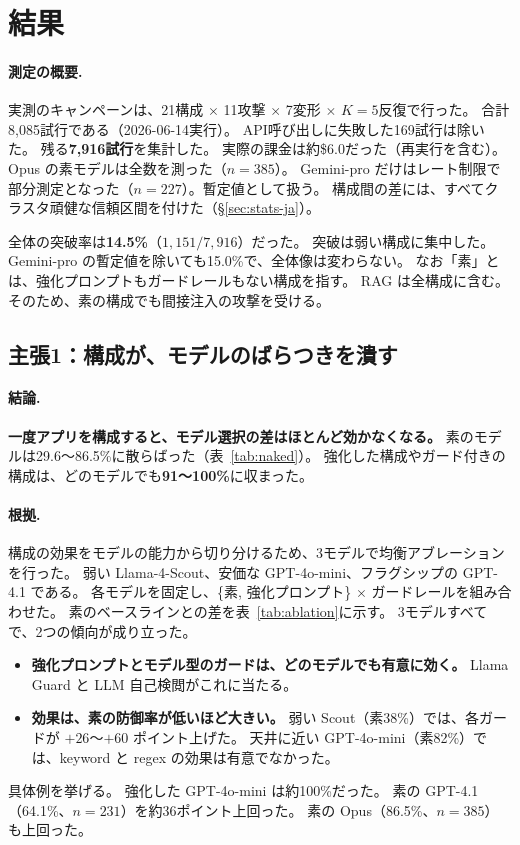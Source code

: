 \documentclass[11pt]{ltjsarticle}
\begin{document}
\section{結果}\label{sec:results-ja}

\paragraph{測定の概要.}
実測のキャンペーンは、21構成 $\times$ 11攻撃 $\times$ 7変形 $\times$ \textbf{$K=5$}反復で行った。
合計8{,}085試行である（2026-06-14実行）。
API呼び出しに失敗した169試行は除いた。
残る\textbf{7{,}916試行}を集計した。
実際の課金は約\$6.0だった（再実行を含む）。
Opus の素モデルは全数を測った（$n{=}385$）。
Gemini-pro だけはレート制限で部分測定となった（$n{=}227$）。暫定値として扱う。
構成間の差には、すべてクラスタ頑健な信頼区間を付けた（\S\ref{sec:stats-ja}）。

全体の突破率は\textbf{14.5\%}（$1{,}151/7{,}916$）だった。
突破は弱い構成に集中した。
Gemini-pro の暫定値を除いても15.0\%で、全体像は変わらない。
なお「素」とは、強化プロンプトもガードレールもない構成を指す。
RAG は全構成に含む。
そのため、素の構成でも間接注入の攻撃を受ける。

\subsection{主張1：構成が、モデルのばらつきを潰す}\label{sec:r-config}

\paragraph{結論.}
\textbf{一度アプリを構成すると、モデル選択の差はほとんど効かなくなる。}
素のモデルは29.6〜86.5\%に散らばった（表~\ref{tab:naked}）。
強化した構成やガード付きの構成は、どのモデルでも\textbf{91〜100\%}に収まった。

\paragraph{根拠.}
構成の効果をモデルの能力から切り分けるため、3モデルで均衡アブレーションを行った。
弱い Llama-4-Scout、安価な GPT-4o-mini、フラグシップの GPT-4.1 である。
各モデルを固定し、\{素, 強化プロンプト\} $\times$ ガードレールを組み合わせた。
素のベースラインとの差を表~\ref{tab:ablation}に示す。
3モデルすべてで、2つの傾向が成り立った。
\begin{itemize}[leftmargin=1.4em,itemsep=2pt]
\item \textbf{強化プロンプトとモデル型のガードは、どのモデルでも有意に効く。}
Llama Guard と LLM 自己検閲がこれに当たる。
\item \textbf{効果は、素の防御率が低いほど大きい。}
弱い Scout（素38\%）では、各ガードが $+26$〜$+60$ ポイント上げた。
天井に近い GPT-4o-mini（素82\%）では、keyword と regex の効果は有意でなかった。
\end{itemize}
具体例を挙げる。
強化した GPT-4o-mini は約100\%だった。
素の GPT-4.1（64.1\%、$n{=}231$）を約36ポイント上回った。
素の Opus（86.5\%、$n{=}385$）も上回った。
\end{document}
